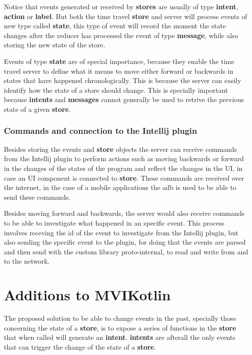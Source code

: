 Notice that events generated or received by \textbf{stores} are usually of type \textbf{intent}, \textbf{action} or \textbf{label}. But both the time travel \textbf{store} and server will process events of new type called \textbf{state}, this type of event will record the moment the state changes after the reducer has processed the event of type \textbf{message}, while also storing the new state of the store.

Events of type \textbf{state} are of special importance, because they enable the time travel server to define what it means to move either forward or backwards in states that have happened chronologically. This is because the server can easily identify how the state of a store should change. This is specially important because \textbf{intents} and \textbf{messages} cannot generally be used to retrive the previous state of a given \textbf{store}.

\subsubsection{Commands and connection to the Intellij plugin}

Besides storing the events and \textbf{store} objects the server can receive commands from the Intellij plugin to perform actions such as moving backwards or forward in the changes of the states of the program and reflect the changes in the UI, in case an UI component is connected to \textbf{store}. These commands are received over the internet, in the case of a mobile applications the adb is used to be able to send these commands.

Besides moving forward and backwards, the server would also receive commands to be able to investigate what happened in an specific event. This process involves receving the id of the event to investigate from the Intellij plugin, but also sending the specific event to the plugin, for doing that the events are parsed and then send with the custom library proto-internal, to read and write from and to the network.

\section{Additions to MVIKotlin}

The proposed solution to be able to change events in the past, specially those concerning the state of a \textbf{store}, is to expose a series of functions in the \textbf{store} that when called will generate an \textbf{intent}. \textbf{intents} are afterall the only events that can trigger the change of the state of a \textbf{store}.

